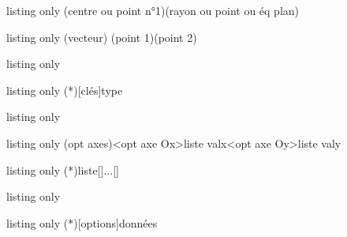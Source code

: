 \begin{PresCodeTexPL}{listing only}
\TrouveEqSphere[clés](centre ou point n°1)(rayon ou point ou éq plan)
\end{PresCodeTexPL}

\begin{PresCodeTexPL}{listing only}
\TrouveNorme(vecteur)
\TrouveNorme(point 1)(point 2)
\end{PresCodeTexPL}

\begin{PresCodeTexPL}{listing only}
\pfleqreduite
\end{PresCodeTexPL}

\begin{PresCodeTexPL}{listing only}
\SchemaEspace(*)[clés]{type}
\pflschemesp
\end{PresCodeTexPL}

\begin{PresCodeTexPL}{listing only}
\pflcalcreglin
\end{PresCodeTexPL}

\begin{PresCodeTexPL}{listing only}
\AxesTikz[options]
 
\FenetreTikz \OrigineTikz
\FenetreSimpleTikz[options](opt axes)<opt axe Ox>{liste valx}<opt axe Oy>{liste valy}
\PointMoyenTikz[options]
\end{PresCodeTexPL}

\begin{PresCodeTexPL}{listing only}
\DeterminerParamStats(*){liste}[\macromin]...[\macromax]
\pflparamstats
\end{PresCodeTexPL}

\begin{PresCodeTexPL}{listing only}
\BoiteMoustaches[options]
\BoiteMoustachesAxe[options]
\pflboitemoustach
\end{PresCodeTexPL}

\begin{PresCodeTexPL}{listing only}
\Histogramme(*)[options]{données}
\pflhistogramme
\end{PresCodeTexPL}

